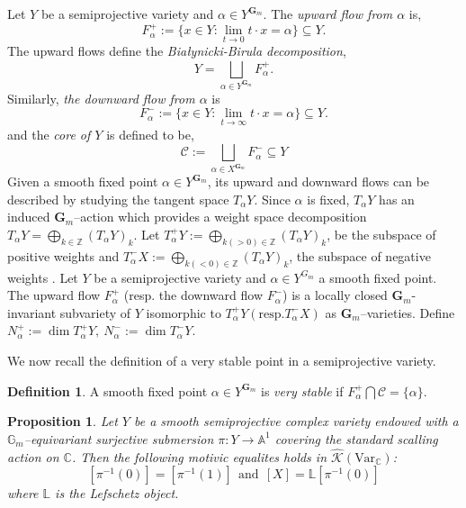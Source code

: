\documentclass[12pt,reqno]{amsart}
\numberwithin{equation}{subsection}
\newtheorem{proposition}[equation]{Proposition}
\theoremstyle{definition}
\newtheorem{defn}[equation]{Definition}
\theoremstyle{theorem}
\begin{document}
Let $Y$ be a semiprojective variety and $\alpha \in Y^{\mathbf{G}_{m}}$. The \textit{upward flow from $\alpha$} is,
\[ F_{\alpha}^{+}:= \{x \in Y : \lim_{t\rightarrow 0}t\cdot x = \alpha\} \subseteq Y.\]
The upward flows define the \textit{Białynicki-Birula decomposition},
\[Y = \bigsqcup_{\alpha \in Y^{\mathbf{G}_{m}}}F_{\alpha}^{+}.\]
Similarly, \textit{the downward flow from $\alpha$} is
\[ F_{\alpha}^{-}:= \{x \in Y : \lim_{t\rightarrow \infty}t\cdot x = \alpha\} \subseteq Y.\]
and the \textit{core of $Y$} is defined to be, 
\[\mathcal{C}:=\bigsqcup_{\alpha \in X^{\mathbf{G}_{m}}}F_{\alpha}^{-}\subseteq Y\]
Given a smooth fixed point $\alpha \in Y^{\mathbf{G}_{m}}$, its upward and downward flows can be described by studying the tangent space $T_{\alpha}Y$. Since $\alpha$ is fixed, $T_{\alpha}Y$ has an induced $\mathbf{G}_{m}$--action which provides a weight space decomposition $T_{\alpha}Y =\bigoplus_{k\in \mathbb{Z}}(T_{\alpha}Y)_{k}$. Let $T^{+}_{\alpha}Y := \bigoplus_{k(>0)\in \mathbb{Z}}(T_{\alpha}Y)_{k}$, be the subspace of positive weights and $T^{-}_{\alpha}X := \bigoplus_{k(<0)\in \mathbb{Z}}(T_{\alpha}Y)_{k}$, the subspace of negative weights \cite[\S\,2, Proposition 2.1]{Hausel-Hitchin-2022}. Let $Y$ be a semiprojective variety and $\alpha \in  Y^{G_{m}}$ a smooth fixed point. The upward flow $F_{\alpha}^{+}$ (resp. the downward flow $F_{\alpha}^{-}$) is a locally closed $\mathbf{G}_{m}$-invariant subvariety of $Y$ isomorphic to $T^{+}_{\alpha}Y (\text{resp.} T^{-}_{\alpha}X)$ as $\mathbf{G}_{m}$--varieties. Define $N^{+}_{\alpha}:=\dim T^{+}_{\alpha}Y, \ N^{-}_{\alpha}:=\dim T^{-}_{\alpha}Y$.

We now recall the definition \cite[Definition 2.12]{Hausel-Hitchin-2022} of a very stable point in a semiprojective variety.

\begin{defn}
	A smooth fixed point $\alpha \in Y^{\mathbf{G}_{m}}$ is \textit{very stable} if $F^{+}_{\alpha} \bigcap \mathcal{C}= \{\alpha\}$.
\end{defn}


\begin{proposition}\cite[\S\,5, Theorem 5.6]{Alfaya-Oliveire-2024}\label{prop: motivic equality of smooth complex variety}
Let $Y$ be a smooth semiprojective complex variety endowed with a $\mathbb{G}_{m}$--equivariant surjective submersion $\pi:Y\rightarrow \mathbb{A}^{1}$ covering the standard scalling action on $\mathbb{C}$. Then the following motivic equalites holds in $\hat{\mathcal{K}}(\text{Var}_{\mathbb{C}})$:
\[[\pi^{-1}(0)]=[\pi^{-1}(1)] \ \ \text{and}  \ \ [X]=\mathbb{L}[\pi^{-1}(0)]\]where $\mathbb{L}$ is the Lefschetz object.
\end{proposition}
\end{document}
